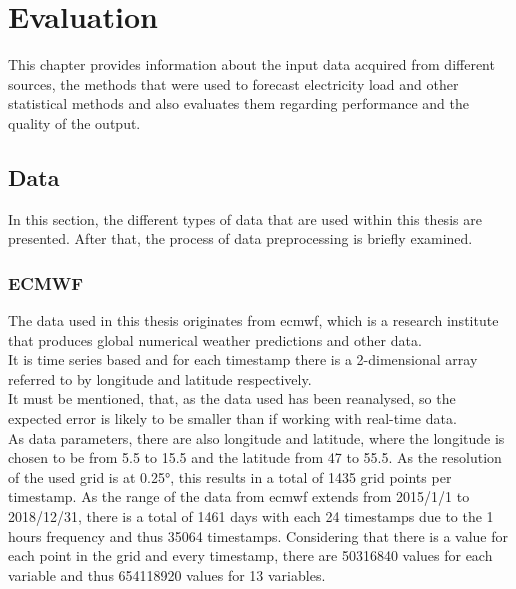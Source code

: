 \chapter{Evaluation}
\label{ch:Evaluation}

This chapter provides information about the input data acquired from different sources, the methods that were used to forecast electricity load and other statistical methods and also evaluates them regarding performance and the quality of the output.\\


\section{Data}
\label{sec:data}

In this section, the different types of data that are used within this thesis are presented. After that, the process of data preprocessing is briefly examined.\\



\subsection{ECMWF}

The data used in this thesis originates from \acrshort{ecmwf}, which is a research institute that produces global numerical weather predictions and other data.\\
It is time series based and for each timestamp there is a 2-dimensional array referred to by longitude and latitude respectively.\\

It must be mentioned, that, as the data used has been reanalysed, so the expected error is likely to be smaller than if working with real-time data.\\

As data parameters, there are also longitude and latitude, where the longitude is chosen to be from 5.5 to 15.5 and the latitude from 47 to 55.5. As the resolution of the used grid is at 0.25°, this results in a total of 1435 grid points per timestamp. As the range of the data from \acrshort{ecmwf} extends from 2015/1/1 to 2018/12/31, there is a total of 1461 days with each 24 timestamps due to the 1 hours frequency and thus 35064 timestamps. Considering that there is a value for each point in the grid and every timestamp, there are 50316840 values for each variable and thus 654118920 values for 13 variables.\\

